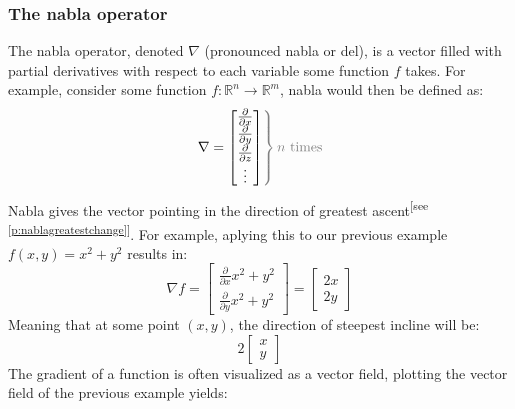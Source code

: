 \documentclass[a4paper,12pt]{article}
\newcommand{\partialder}[2]{\frac{\partial #1}{\partial #2}}        %
\newcommand{\referto}[1]{\textsuperscript{\color{darkgray}\tiny[see \ref{#1}]}}	%
\begin{document}
\subsubsection*{The nabla operator}
The nabla operator, denoted $\nabla$ (pronounced nabla or del), is a vector filled with partial derivatives with respect to each variable some function $f$ takes. For example, consider some function $f:\mathbb{R}^n\rightarrow\mathbb{R}^m$, nabla would then be defined as:
\begin{equation}
	\left.\nabla=
	\begin{bmatrix}
		\partialder{}{x} \\
		\partialder{}{y} \\
		\partialder{}{z} \\ 
		\vdots 	         \\
	\end{bmatrix}
	\color{gray}\right\} \color{gray}n\text{ times}\color{black}
\end{equation}
Nabla gives the vector pointing in the direction of greatest ascent\referto{p:nablagreatestchange}. For example, aplying this to our previous example $f(x,y)=x^2+y^2$ results in:
$$\nabla f=\begin{bmatrix}
	\partialder{}{x}x^2+y^2\\
	\partialder{}{y}x^2+y^2	
\end{bmatrix}=\begin{bmatrix}
	2x\\
	2y
\end{bmatrix}$$
Meaning that at some point $(x,y)$, the direction of steepest incline will be:$$2{\begin{bmatrix}x\\y\end{bmatrix}}$$
The gradient of a function is often visualized as a vector field, plotting the vector field of the previous example yields:
\end{document}
